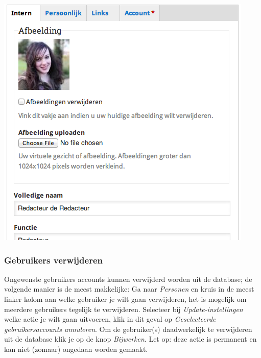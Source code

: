 \begin{center}
	\includegraphics[scale=0.5]{img/profileedit.png}
\end{center}

\subsubsection{Gebruikers verwijderen}

Ongewenste gebruikers accounts kunnen verwijderd worden uit de database; de volgende manier is de meest makkelijke:
Ga naar \emph{Personen} en kruis in de meest linker kolom aan welke gebruiker je wilt gaan verwijderen, het is mogelijk om meerdere gebruikers tegelijk te verwijderen. Selecteer bij \emph{Update-instellingen} welke actie je wilt gaan uitvoeren, klik in dit geval op \emph{Geselecteerde gebruikersaccounts annuleren}. Om de gebruiker(s) daadwerkelijk te verwijderen uit de database klik je op de knop \emph{Bijwerken}. Let op: deze actie is permanent en kan niet (zomaar) ongedaan worden gemaakt. 